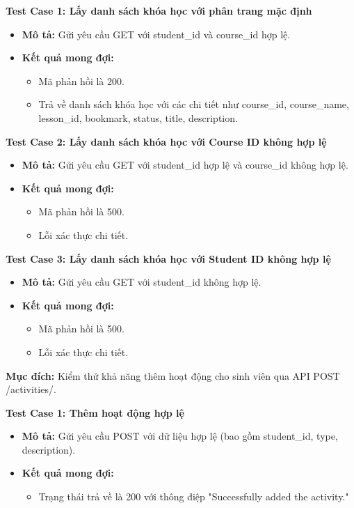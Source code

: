 \textbf{Test Case 1: Lấy danh sách khóa học với phân trang mặc định}
\begin{itemize}
    \item \textbf{Mô tả:} Gửi yêu cầu GET với student\_id và course\_id hợp lệ.
    \item \textbf{Kết quả mong đợi:}
    \begin{itemize}
        \item Mã phản hồi là 200.
        \item Trả về danh sách khóa học với các chi tiết như course\_id, course\_name, lesson\_id, bookmark, status, title, description.
    \end{itemize}
\end{itemize}

\textbf{Test Case 2: Lấy danh sách khóa học với Course ID không hợp lệ}
\begin{itemize}
    \item \textbf{Mô tả:} Gửi yêu cầu GET với student\_id hợp lệ và course\_id không hợp lệ.
    \item \textbf{Kết quả mong đợi:}
    \begin{itemize}
        \item Mã phản hồi là 500.
        \item Lỗi xác thực chi tiết.
    \end{itemize}
\end{itemize}

\textbf{Test Case 3: Lấy danh sách khóa học với Student ID không hợp lệ}
\begin{itemize}
    \item \textbf{Mô tả:} Gửi yêu cầu GET với student\_id không hợp lệ.
    \item \textbf{Kết quả mong đợi:}
    \begin{itemize}
        \item Mã phản hồi là 500.
        \item Lỗi xác thực chi tiết.
    \end{itemize}
\end{itemize}


\textbf{Mục đích:} Kiểm thử khả năng thêm hoạt động cho sinh viên qua API POST /activities/.

\textbf{Test Case 1: Thêm hoạt động hợp lệ}
\begin{itemize}
    \item \textbf{Mô tả:} Gửi yêu cầu POST với dữ liệu hợp lệ (bao gồm student\_id, type, description).
    \item \textbf{Kết quả mong đợi:}
    \begin{itemize}
        \item Trạng thái trả về là 200 với thông điệp "Successfully added the activity."
    \end{itemize}
\end{itemize}

